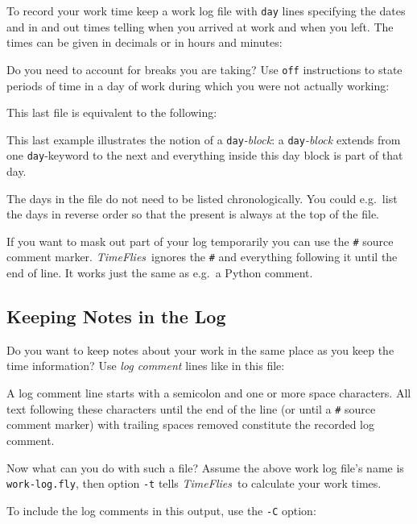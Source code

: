 \documentclass[11pt]{article}
\newcommand{\timeflies}{\emph{TimeFlies}}
\begin{document}
To record your work time keep a work log file with \verb-day- lines specifying the dates and in and out times telling when you arrived at work and when you left. The times can be given in decimals or in hours and minutes:



Do you need to account for breaks you are taking? Use \verb-off- instructions to state periods of time in a day of work during which you were not actually working:



This last file is equivalent to the following:



This last example illustrates the notion of a \verb-day-\emph{-block}: a \verb-day-\emph{-block} extends
from one \verb-day--keyword to the next and everything inside this day block is part of that day.

The days in the file do not need to be listed chronologically. You could e.g.\ list the days in reverse order so that the present is always at the top of the file.

If you want to mask out part of your log temporarily you can use the \verb-#- source comment marker. \timeflies\ ignores the \verb-#- and everything following it until the end of line. It works just the same as e.g.\ a Python comment.



\subsection{Keeping Notes in the Log}

Do you want to keep notes about your work in the same place as you keep the time information? Use \emph{log comment} lines like in this file:



A log comment line starts with a semicolon and one or more space characters. All text following these characters until the end of the line (or until a \verb-#- source comment marker) with trailing spaces removed constitute the recorded log comment.

Now what can you do with such a file? Assume the above work log file's name is \verb:work-log.fly:, then option \verb:-t: tells \timeflies\ to calculate your work times.



To include the log comments in this output, use the \verb=-C= option:
\end{document}
